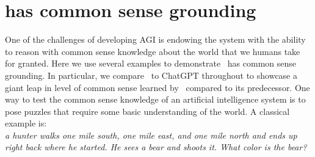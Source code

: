 \section{{\DV} has common sense grounding}
\label{sec:commonsense}

One of the challenges of developing AGI is endowing the system with the ability to reason with common sense knowledge about the world that we humans take for granted. Here we use several examples to demonstrate \DV\ has  common sense grounding. In particular, we compare \DV\ to ChatGPT throughout to showcase a giant leap in level of common sense learned by \DV\ compared to its predecessor. One way to test the common sense knowledge of an artificial intelligence system is to pose puzzles that require some basic understanding of the world. A classical example is:\\

\emph{a hunter walks one mile south, one mile east, and one mile north and ends up right back where he started. He sees a bear and shoots it. What color is the bear?}\\

